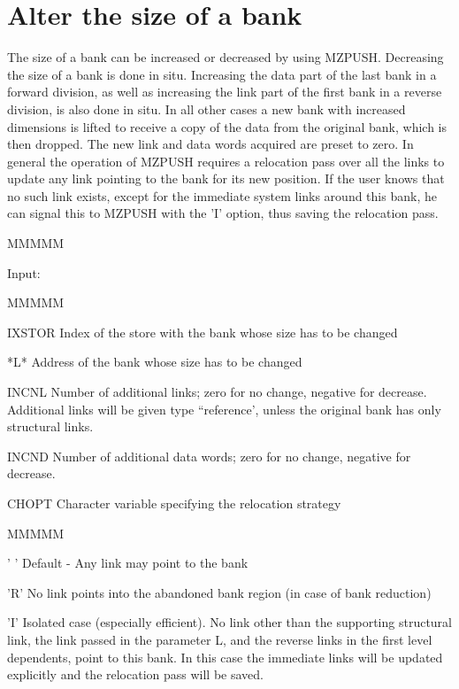 \section{Alter the size of a bank}
\par The size of a bank can be increased or decreased by using MZPUSH.
Decreasing the size of a bank is done in situ. Increasing the data
part of the last bank in a forward division, as well as increasing
the link part of the first bank in a reverse division, is also done
in situ.
In all other cases a new bank with increased dimensions is lifted
to receive a copy of the data from the original bank, which is then
dropped. The new link and data words acquired are preset to zero.
In general the operation of MZPUSH requires a relocation pass over all
the links to update any link pointing to the bank for its new position.
If the user knows that no such link exists, except for the immediate
system links around this bank, he can signal this to MZPUSH with the
'I' option, thus saving the relocation pass.
\begin{DL}{MMMMM}
\item[Input:
]
\begin{DL}{MMMMM}
\item[IXSTOR
]Index of the store with the bank whose size has to be changed
\item[*L*
]Address of the bank whose size has to be changed
\item[INCNL
]Number of additional links;
zero for no change, negative for decrease.
\newline Additional links will be given type ``reference',
unless the original bank has only structural links.
\item[INCND
]Number of additional data words;
zero for no change, negative for decrease.
\item[CHOPT
]Character variable specifying the relocation strategy
\begin{DL}{MMMMM}
\item[' '
]Default - Any link may point to the bank
\item['R'
]No link points into the abandoned bank region
(in case of bank reduction)
\item['I'
]Isolated case (especially efficient).
No link other than the supporting
structural link, the link passed in the parameter L,
and the reverse links in the first level dependents,
point to this bank.
In this case the immediate links will be updated explicitly
and the relocation pass will be saved.
\end{DL}
\end{DL}
\end{DL}
